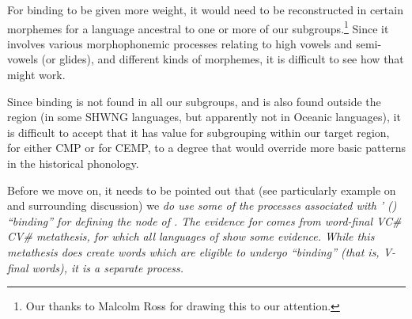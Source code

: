 For binding to be given more weight,
it would need to be reconstructed in certain morphemes for a
language ancestral to one or more of our subgroups.\footnote{
		Our thanks to Malcolm Ross for drawing this to our attention.}
Since it involves various morphophonemic processes relating to high
vowels and semi-vowels (or glides),
and different kinds of morphemes,
it is difficult to see how that might work.

Since binding is not found in all our subgroups,
and is also found outside the region (in some SHWNG languages,
but apparently not in Oceanic languages),
it is difficult to accept that it has value for subgrouping within
our target region, for either CMP or for CEMP,
to a degree that would override more basic patterns in the historical phonology.

Before we move on, it needs to be pointed out that 
(see particularly example  on  and surrounding discussion)
we \it{do} use some of the processes associated
with \citeauthor{Mills1991}' (\citeyear{Mills1991})
``binding'' for defining the  node of .
The evidence for  comes from word-final VC{\#} {\ra} CV{\#} metathesis,
for which all languages of  show some evidence.
While this metathesis does create words 
which are eligible to undergo ``binding''
(that is, V\tsc{[+high]}-final words), it is a separate process.
